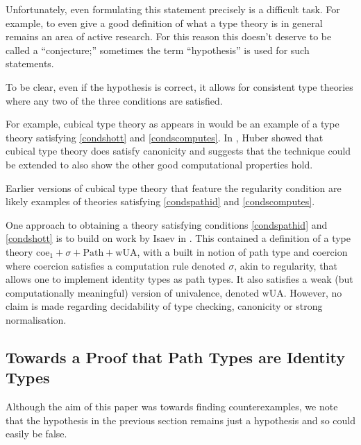 \documentclass[a4paper]{amsart}
\theoremstyle{definition}
\begin{document}
Unfortunately, even formulating this statement precisely is a
difficult task. For example, to even give a good definition of what a
type theory is in general remains an area of active research. For this
reason this doesn't deserve to be called a ``conjecture;'' sometimes
the term ``hypothesis'' is used for such statements.

To be clear, even if the hypothesis is correct, it allows for
consistent type
theories where any two of the three conditions are satisfied.

For example, cubical type theory as appears in \cite{coquandcubicaltt}
would be an example of a type theory satisfying \ref{condshott} and
\ref{condscomputes}. In \cite{hubercanonicity}, Huber showed that
cubical type theory does satisfy canonicity and suggests that the
technique could be extended to also show the other good computational
properties hold.

Earlier versions of cubical type theory that feature the regularity
condition are likely examples of theories satisfying \ref{condspathid}
and \ref{condscomputes}.

One approach to obtaining a theory satisfying conditions
\ref{condspathid} and \ref{condshott} is to build on work by Isaev in
\cite{isaevmodelstr}. This contained a definition of a type theory
$\mathrm{coe}_1 + \sigma + \mathrm{Path} + \mathrm{wUA}$, with a built
in notion of path type and coercion where coercion
satisfies a computation rule denoted $\sigma$, akin to
regularity, that allows one to implement identity types as path
types. It also satisfies a weak (but computationally meaningful)
version of univalence, denoted $\mathrm{wUA}$. However, no claim is
made regarding decidability of type checking, canonicity or strong
normalisation.

\subsection{Towards a Proof that Path Types are Identity Types}
\label{sec:towards-proof-that}

Although the aim of this paper was towards finding counterexamples, we
note that the hypothesis in the previous section remains just a
hypothesis and so could easily be false.
\end{document}
